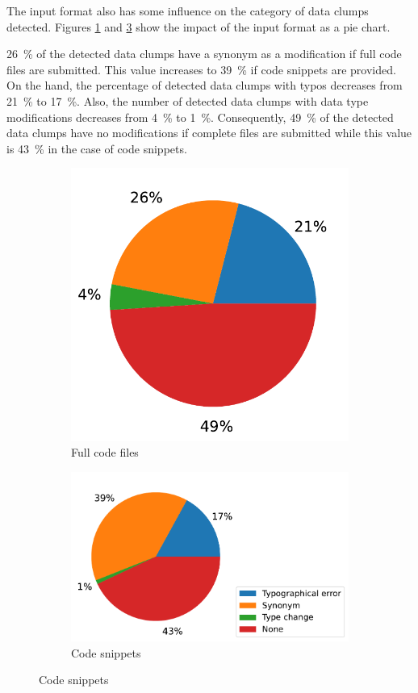 The input format also has some influence on the category of data clumps detected. Figures \ref{fig:detectSyn_full_files} and \ref{fig:detectSyn_snippets} show the impact of the input format as a pie chart. 

 26~\% of the detected data clumps have a synonym as a modification if full code files are submitted. This value increases to 39~\% if code snippets are provided. On the hand, the percentage of detected data clumps with typos decreases from 21~\% to 17~\%. Also, the number of detected data clumps with data type modifications decreases from 4~\% to 1~\%. Consequently, 49~\% of the detected data clumps have no modifications if complete files are submitted while this value is 43~\% in the case of code snippets.  

\begin{figure}[ht!]
    \centering
    \begin{subfigure}[t]{0.5\columnwidth}
        \includegraphics[width=0.8\columnwidth]{figures/chapter5/detectSyn_input_fullFile.pdf}
        \caption{Full code files}
        \label{fig:detectSyn_full_files}
    \end{subfigure}
            \begin{subfigure}[t]{0.5\columnwidth}
        \includegraphics[width=1.3\columnwidth]{figures/chapter5/detectSyn_input_snippet.pdf}
        \caption{Code snippets}
       \label{fig:detectSyn_snippets}
    \end{subfigure}
       


\end{figure}
